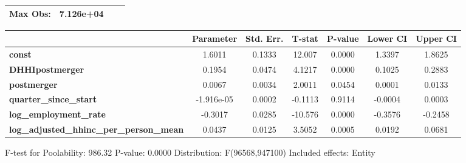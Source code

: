 \documentclass{report}
\begin{document}
\begin{center}
\begin{tabular}{lclc}
\textbf{Max Obs:}                                &      7.126e+04       & \textbf{                     }   &                  \\
\bottomrule
\end{tabular}
\begin{tabular}{lcccccc}
                                                 & \textbf{Parameter} & \textbf{Std. Err.} & \textbf{T-stat} & \textbf{P-value} & \textbf{Lower CI} & \textbf{Upper CI}  \\
\midrule
\textbf{const}                                   &       1.6011       &       0.1333       &      12.007     &      0.0000      &       1.3397      &       1.8625       \\
\textbf{DHHIpostmerger}                          &       0.1954       &       0.0474       &      4.1217     &      0.0000      &       0.1025      &       0.2883       \\
\textbf{postmerger}                              &       0.0067       &       0.0034       &      2.0011     &      0.0454      &       0.0001      &       0.0133       \\
\textbf{quarter\_since\_start}                   &     -1.916e-05     &       0.0002       &     -0.1113     &      0.9114      &      -0.0004      &       0.0003       \\
\textbf{log\_employment\_rate}                   &      -0.3017       &       0.0285       &     -10.576     &      0.0000      &      -0.3576      &      -0.2458       \\
\textbf{log\_adjusted\_hhinc\_per\_person\_mean} &       0.0437       &       0.0125       &      3.5052     &      0.0005      &       0.0192      &       0.0681       \\
\bottomrule
\end{tabular}
\end{center}

F-test for Poolability: 986.32 \newline
 P-value: 0.0000 \newline
 Distribution: F(96568,947100) \newline
  \newline
 Included effects: Entity
\end{document}
